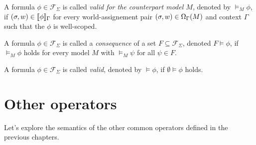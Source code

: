 \begin{definition}
  A formula $\phi \in \mathcal{F}_\Sigma$ is called \emph{valid for the counterpart model $M$}, denoted by $\vDash_M
  \phi$, if $(\sigma, w) \in \llbracket \phi \rrbracket_{\Gamma}$ for every world-assignement pair $(\sigma, w) \in \Omega_{\Gamma}(M)$
  and context $\Gamma$ such that the $\phi$ is well-scoped.
\end{definition}
\begin{definition}
  A formula $\phi \in \mathcal{F}_\Sigma$ is called a \emph{consequence} of a set $F \subseteq \mathcal{F}_\Sigma$,
  denoted $F \vDash \phi$, if $\vDash_M \phi$ holds for every model $M$ with $\vDash_M \psi$ for all $\psi \in F$.
\begin{definition}
\end{definition}
  A formula $\phi \in \mathcal{F}_\Sigma$ is called \emph{valid}, denoted by $\vDash \phi$, if $\emptyset \vDash \phi$
  holds.
\end{definition}

\section{Other operators}
Let's explore the semantics of the other common operators defined in the previous chapters.

